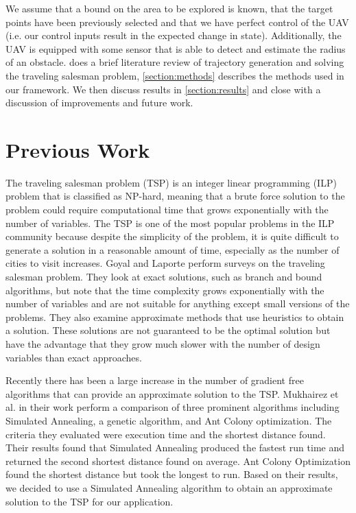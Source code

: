 \documentclass[letterpaper,conference, 10pt]{ieeeconf}
\begin{document}
We assume that a bound on the area to be explored is known, that the target points have been previously selected and that we have perfect control of the UAV (i.e. our control inputs result in the expected change in state). Additionally, the UAV is equipped with some sensor that is able to detect and estimate the radius of an obstacle.  does a brief literature review of trajectory generation and solving the traveling salesman problem, \cref{section:methods} describes the methods used in our framework. We then discuss results in \cref{section:results} and close with a discussion of improvements and future work.

\section{Previous Work}
\label{section:prev_work}

The traveling salesman problem (TSP) is an integer linear programming (ILP) problem that is classified as NP-hard, meaning that a brute force solution to the problem could require computational time that grows exponentially with the number of variables. The TSP is one of the most popular problems in the ILP community because despite the simplicity of the problem, it is quite difficult to generate a solution in a reasonable amount of time, especially as the number of cities to visit increases. Goyal \cite{goyal2010survey} and Laporte \cite{laporte1992traveling} perform surveys on the traveling salesman problem. They look at exact solutions, such as branch and bound algorithms, but note that the time complexity grows exponentially with the number of variables and are not suitable for anything except small versions of the problems. They also examine approximate methods that use heuristics to obtain a solution. These solutions are not guaranteed to be the optimal solution but have the advantage that they grow much slower with the number of design variables than exact approaches.

Recently there has been a large increase in the number of gradient free algorithms that can provide an approximate solution to the TSP. Mukhairez et al. in their work \cite{mukhairez2015performance} perform a comparison of three prominent algorithms including Simulated Annealing, a genetic algorithm, and Ant Colony optimization. The criteria they evaluated were execution time and the shortest distance found. Their results found that Simulated Annealing produced the fastest run time and returned the second shortest distance found on average. Ant Colony Optimization found the shortest distance but took the longest to run. Based on their results, we decided to use a Simulated Annealing algorithm to obtain an approximate solution to the TSP for our application.
\end{document}
